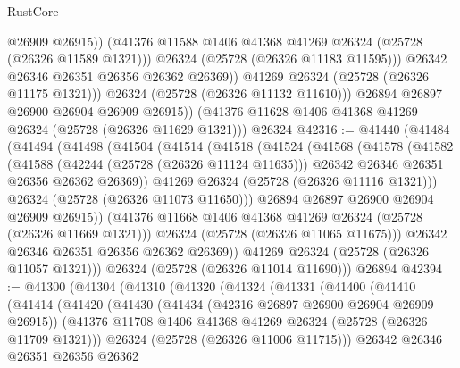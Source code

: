 \begin{lexlean}{RustCore}
\begin{coremodule}
                      @26909
                      @26915))
                  (@41376 @11588 @1406 @41368 @41269 @26324 (@25728 (@26326 @11589 @1321)))
                  @26324
                  (@25728 (@26326 @11183 @11595)))
                @26342
                @26346
                @26351
                @26356
                @26362
                @26369))
            @41269
            @26324
            (@25728 (@26326 @11175 @1321)))
          @26324
          (@25728 (@26326 @11132 @11610)))
        @26894
        @26897
        @26900
        @26904
        @26909
        @26915))
    (@41376 @11628 @1406 @41368 @41269 @26324 (@25728 (@26326 @11629 @1321)))
    @26324
@42316 := @41440
    (@41484
      (@41494
        (@41498
          (@41504
            (@41514
              (@41518
                (@41524
                  (@41568
                    (@41578
                      (@41582
                        (@41588
                          (@42244 (@25728 (@26326 @11124 @11635)))
                          @26342
                          @26346
                          @26351
                          @26356
                          @26362
                          @26369))
                      @41269
                      @26324
                      (@25728 (@26326 @11116 @1321)))
                    @26324
                    (@25728 (@26326 @11073 @11650)))
                  @26894
                  @26897
                  @26900
                  @26904
                  @26909
                  @26915))
              (@41376 @11668 @1406 @41368 @41269 @26324 (@25728 (@26326 @11669 @1321)))
              @26324
              (@25728 (@26326 @11065 @11675)))
            @26342
            @26346
            @26351
            @26356
            @26362
            @26369))
        @41269
        @26324
        (@25728 (@26326 @11057 @1321)))
      @26324
      (@25728 (@26326 @11014 @11690)))
    @26894
@42394 := @41300
    (@41304
      (@41310
        (@41320
          (@41324
            (@41331
              (@41400
                (@41410
                  (@41414
                    (@41420
                      (@41430
                        (@41434 (@42316 @26897 @26900 @26904 @26909 @26915))
                        (@41376 @11708 @1406 @41368 @41269 @26324 (@25728 (@26326 @11709 @1321)))
                        @26324
                        (@25728 (@26326 @11006 @11715)))
                      @26342
                      @26346
                      @26351
                      @26356
                      @26362

\end{coremodule}
\end{lexlean}
